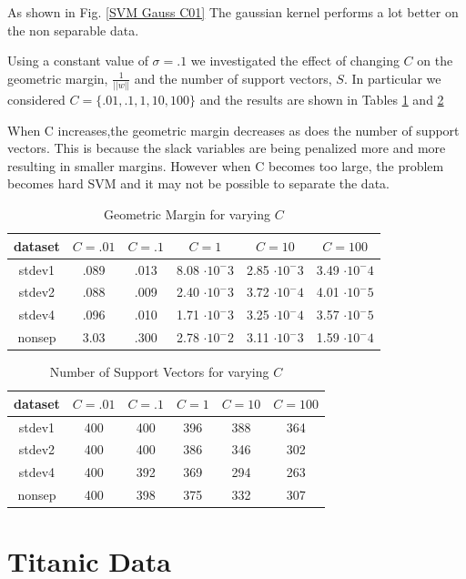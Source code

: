 \documentclass[10pt,twocolumn]{article}
\begin{document}
As shown in Fig. \ref{SVM Gauss C01} The gaussian kernel performs a lot better on the non separable data. 
       
 Using a constant value of $\sigma=.1$ we investigated the effect of changing $C$ on the geometric margin, $\frac{1}{||w||}$ and the number of support vectors, $S$. In particular we considered $C= \{.01, .1, 1, 10, 100 \}$
 and the  results are shown in Tables \ref{SVM Gauss Marg} and \ref{SVM Gauss S}
 

When C increases,the geometric margin decreases as does the number of support vectors. This is because the slack variables are being penalized more and more resulting in smaller margins. However when C becomes too large, the problem becomes hard SVM and it may not be possible to separate the data. 

 \begin{table}
 \tiny
 \caption{ Geometric Margin for varying $C$}
  \begin{tabular}{ | c | c | c | c | c | c| }
 \hline
 dataset & $C=.01$ & $C=.1$ & $C=1 $ & $C=10$ & $C=100$   \\ \hline 
 stdev1 & .089 &  .013 & 8.08 $\cdot 10^-3$ & 2.85 $\cdot 10^-3$ & 3.49 $\cdot 10^-4$ \\ \hline
 stdev2 & .088 & .009 & 2.40 $\cdot 10^-3$  & 3.72 $\cdot 10^-4$ & 4.01 $\cdot 10^-5$\\ \hline
 stdev4 & .096 & .010 & 1.71 $\cdot 10^-3$  & 3.25 $\cdot 10^-4$ & 3.57 $\cdot 10^-5$\\ \hline 
 nonsep & 3.03 & .300 & 2.78 $\cdot 10^-2$  &  3.11 $\cdot 10^-3$ & 1.59 $\cdot 10^-4$\\ \hline
 \end{tabular}
 \label{SVM Gauss Marg}
\end{table}

\begin{table}
 \scriptsize
 \caption{ Number of Support Vectors for varying $C$}
  \begin{tabular}{ | c | c | c | c | c | c| }
 \hline
 dataset & $C=.01$ & $C=.1$ & $C=1 $ & $C=10$ & $C=100$   \\ \hline 
 stdev1 & 400  &  400 & 396 & 388 & 364  \\ \hline
 stdev2 & 400 & 400 & 386  & 346 & 302 \\ \hline
 stdev4 & 400 & 392 & 369 & 294 & 263 \\ \hline 
 nonsep & 400 & 398 & 375  &  332 & 307 \\ \hline
 \end{tabular}
 \label{SVM Gauss S}
\end{table}

\section{Titanic Data}

  
\end{document}
